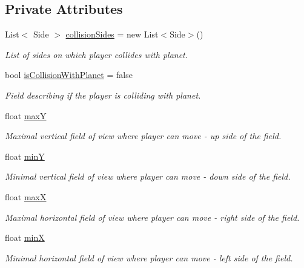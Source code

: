 \subsection*{Private Attributes}
\begin{DoxyCompactItemize}
\item 
List$<$ Side $>$ \mbox{\hyperlink{class_move_a727888662ad4981d5935f212174e050b}{collision\+Sides}} = new List$<$Side$>$()
\begin{DoxyCompactList}\small\item\em List of sides on which player collides with planet. \end{DoxyCompactList}\item 
bool \mbox{\hyperlink{class_move_a2d2bbc6c6fb1799016e619d21362f4c1}{is\+Collision\+With\+Planet}} = false
\begin{DoxyCompactList}\small\item\em Field describing if the player is colliding with planet. \end{DoxyCompactList}\item 
float \mbox{\hyperlink{class_move_a60bf2e4d67e4ea7800e7d6dc9a5ab655}{maxY}}
\begin{DoxyCompactList}\small\item\em Maximal vertical field of view where player can move -\/ up side of the field. \end{DoxyCompactList}\item 
float \mbox{\hyperlink{class_move_ac39298eb08947581f3308d499bd4b5cf}{minY}}
\begin{DoxyCompactList}\small\item\em Minimal vertical field of view where player can move -\/ down side of the field. \end{DoxyCompactList}\item 
float \mbox{\hyperlink{class_move_abfc7d7aef2e83ad1b109cddd3adf08aa}{maxX}}
\begin{DoxyCompactList}\small\item\em Maximal horizontal field of view where player can move -\/ right side of the field. \end{DoxyCompactList}\item 
float \mbox{\hyperlink{class_move_a3af9987290d9102403ef5218d5c174aa}{minX}}
\begin{DoxyCompactList}\small\item\em Minimal horizontal field of view where player can move -\/ left side of the field. \end{DoxyCompactList}\end{DoxyCompactItemize}


